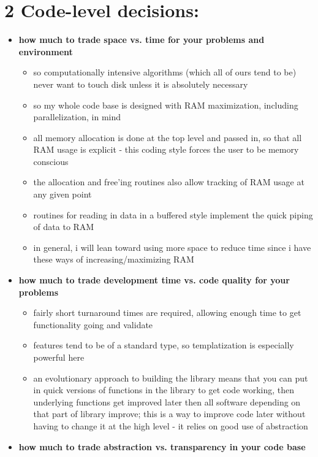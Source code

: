 \section*{2  Code-level decisions:}
\begin{itemize}
\item {\bf how much to trade space vs. time for your problems and environment}
	\begin{itemize}
	item fact: disk access is about 1 million times as slow as memory access
	\item so computationally intensive algorithms (which all of ours tend to be)
			never want to touch disk unless it is absolutely necessary
	\item so my whole code base is designed with RAM maximization, including
			parallelization, in mind
	\item all memory allocation is done at the top level and passed in, so that
			all RAM usage is explicit - this coding style forces the user to
			be memory conscious
	\item the allocation and free'ing routines also allow tracking of RAM usage
			at any given point
	\item routines for reading in data in a buffered style implement the quick 
			piping of data to RAM
	\item in general, i will lean toward using more space to reduce time since i
			have these ways of increasing/maximizing RAM
	\end{itemize}
\item {\bf how much to trade development time vs. code quality for your 
	problems}
	\begin{itemize}
	\item fairly short turnaround times are required, allowing enough time to
			get functionality going and validate
	\item features tend to be of a standard type, so templatization is especially
			powerful here
	\item an evolutionary approach to building the library means that you can put
			in quick versions of functions in the library to get code working, 
			then underlying functions get improved later then all software
			depending on that part of library improve; this is a way to improve
			code later without having to change it at the high level - it
			relies on good use of abstraction
	\end{itemize}
\item {\bf how much to trade abstraction vs. transparency in your code base}

\end{itemize}
